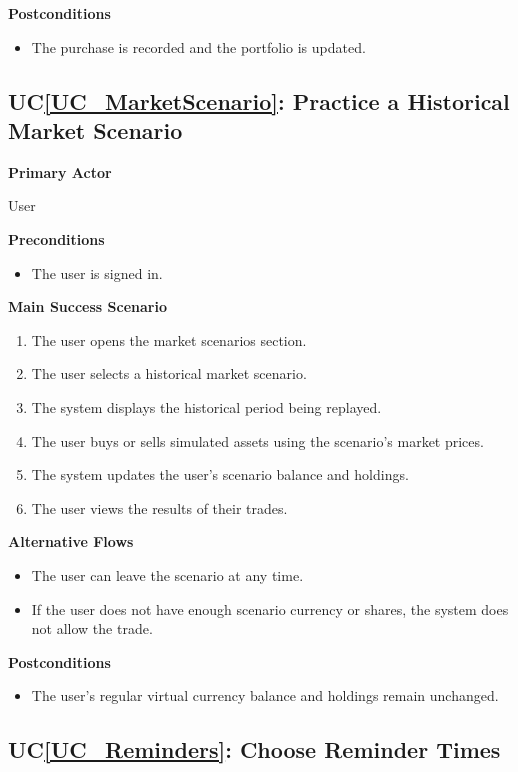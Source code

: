 \documentclass[12pt]{article}
\newcounter{ucnum} %
\newcommand{\ucref}[1]{UC\ref{#1}}
\begin{document}
\textbf{Postconditions}
\begin{itemize}
\item The purchase is recorded and the portfolio is updated.
\end{itemize}


\label{UC_MarketScenario}
\subsection{\ucref{UC_MarketScenario}: Practice a Historical Market Scenario}

\textbf{Primary Actor}

User

\textbf{Preconditions}
\begin{itemize}
\item The user is signed in.
\end{itemize}

\textbf{Main Success Scenario}
\begin{enumerate}
\item The user opens the market scenarios section.
\item The user selects a historical market scenario.
\item The system displays the historical period being replayed.
\item The user buys or sells simulated assets using the scenario's market prices.
\item The system updates the user's scenario balance and holdings.
\item The user views the results of their trades.
\end{enumerate}

\textbf{Alternative Flows}
\begin{itemize}
\item The user can leave the scenario at any time.
\item If the user does not have enough scenario currency or shares, the system does not allow the trade.
\end{itemize}

\textbf{Postconditions}
\begin{itemize}
\item The user's regular virtual currency balance and holdings remain unchanged.
\end{itemize}


\label{UC_Reminders}
\subsection{\ucref{UC_Reminders}: Choose Reminder Times}
\end{document}

